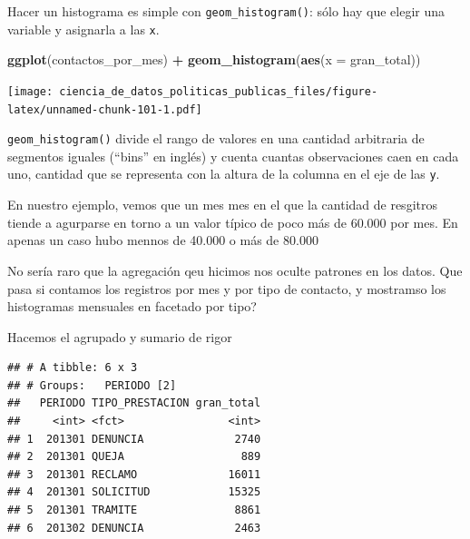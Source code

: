 \documentclass[]{book}
\newenvironment{Shaded}{\begin{snugshade}}{\end{snugshade}}
\newcommand{\KeywordTok}[1]{\textcolor[rgb]{0.13,0.29,0.53}{\textbf{#1}}}
\newcommand{\DataTypeTok}[1]{\textcolor[rgb]{0.13,0.29,0.53}{#1}}
\newcommand{\StringTok}[1]{\textcolor[rgb]{0.31,0.60,0.02}{#1}}
\newcommand{\OperatorTok}[1]{\textcolor[rgb]{0.81,0.36,0.00}{\textbf{#1}}}
\newcommand{\NormalTok}[1]{#1}
\begin{document}
Hacer un histograma es simple con \texttt{geom\_histogram()}: sólo hay
que elegir una variable y asignarla a las \texttt{x}.

\begin{Shaded}
\begin{Highlighting}[]
\KeywordTok{ggplot}\NormalTok{(contactos_por_mes) }\OperatorTok{+}\StringTok{ }
\StringTok{    }\KeywordTok{geom_histogram}\NormalTok{(}\KeywordTok{aes}\NormalTok{(}\DataTypeTok{x =}\NormalTok{ gran_total))}
\end{Highlighting}
\end{Shaded}

\texttt{[image: ciencia\_de\_datos\_politicas\_publicas\_files/figure-latex/unnamed-chunk-101-1.pdf]}

\texttt{geom\_histogram()} divide el rango de valores en una cantidad
arbitraria de segmentos iguales (``bins'' en inglés) y cuenta cuantas
observaciones caen en cada uno, cantidad que se representa con la altura
de la columna en el eje de las \texttt{y}.

En nuestro ejemplo, vemos que un mes mes en el que la cantidad de
resgitros tiende a agurparse en torno a un valor típico de poco más de
60.000 por mes. En apenas un caso hubo mennos de 40.000 o más de 80.000

No sería raro que la agregación qeu hicimos nos oculte patrones en los
datos. Que pasa si contamos los registros por mes y por tipo de
contacto, y mostramso los histogramas mensuales en facetado por tipo?

Hacemos el agrupado y sumario de rigor

\begin{Shaded}
\end{Shaded}

\begin{verbatim}
## # A tibble: 6 x 3
## # Groups:   PERIODO [2]
##   PERIODO TIPO_PRESTACION gran_total
##     <int> <fct>                <int>
## 1  201301 DENUNCIA              2740
## 2  201301 QUEJA                  889
## 3  201301 RECLAMO              16011
## 4  201301 SOLICITUD            15325
## 5  201301 TRAMITE               8861
## 6  201302 DENUNCIA              2463
\end{verbatim}
\end{document}
